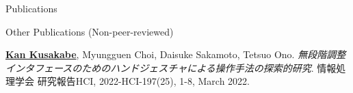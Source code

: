 \documentclass[
    11pt, %
]{resume} %
\begin{document}
\begin{rSection}{Publications}
\begin{rSubsection}{Other Publications (Non-peer-reviewed)}{}{}{}
    \item \underline{\textbf{Kan Kusakabe}}, Myungguen Choi, Daisuke Sakamoto, Tetsuo Ono.
    \textit{無段階調整インタフェースのためのハンドジェスチャによる操作手法の探索的研究}. 情報処理学会 研究報告HCI, 2022-HCI-197(25), 1-8, March 2022.\\
\end{rSubsection}

\end{rSection}
\end{document}
